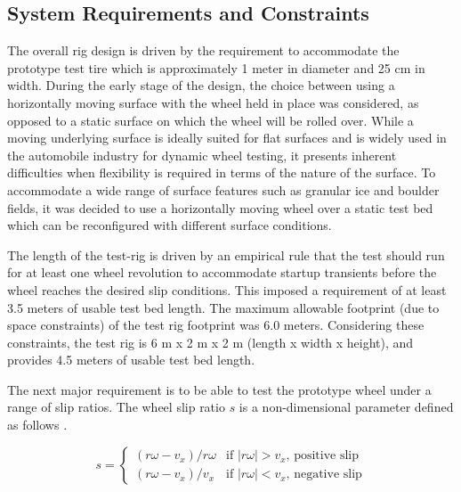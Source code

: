 \documentclass{article}
\begin{document}
\subsection{System Requirements and Constraints}

The overall rig design is driven by the requirement to accommodate the prototype test tire which is approximately 1 meter in diameter and 25 cm in width.  During the early stage of the design, the choice between using a horizontally moving surface with the wheel held in place was considered, as opposed to a static surface on which the wheel will be rolled over. While a moving underlying surface is ideally suited for flat surfaces and is widely used in the automobile industry for dynamic wheel testing, it presents inherent difficulties when flexibility is required in terms of the nature of the surface.  To accommodate a wide range of surface features such as granular ice and boulder fields, it was decided to use a horizontally moving wheel over a static test bed which can be reconfigured with different surface conditions. 

The length of the test-rig is driven by an empirical rule that the test should run for at least one wheel revolution to accommodate startup transients before the wheel reaches the desired slip conditions.  This imposed a requirement of at least 3.5 meters of usable test bed length. The maximum allowable footprint (due to space constraints) of the test rig footprint was 6.0 meters. Considering these constraints, the test rig is 6 m x 2 m x 2 m (length x width x height), and provides 4.5 meters of usable test bed length. 

The next major requirement is to be able to test the prototype wheel under a range of slip ratios. The wheel slip ratio $s$ is a non-dimensional parameter defined as follows \cite{ishigami2008terramechanics}.

\begin{equation}
        s =
        \left\{ \begin{array}{ll}
            (r\omega - v_x)/r\omega &  \text{if $|r\omega| > v_x$, positive slip} \\
             (r\omega - v_x)/v_x &  \text{if $|r\omega| < v_x$, negative slip} 
        \end{array} \right.
    \end{equation}
\end{document}
